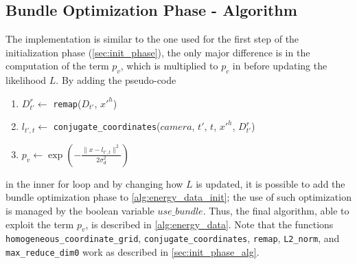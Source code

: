 \documentclass[notitlepage,english]{hgbreport}
\begin{document}
\subsection{Bundle Optimization Phase - Algorithm}
The implementation is similar to the one used for the first step of the initialization phase (\cref{sec:init_phase}), the only major difference is in the computation of the term $p_v$, which is multiplied to $p_c$ in before updating the likelihood $L$. By adding the pseudo-code
\begin{enumerate}
		\item $D^r_{t'} \leftarrow$ \texttt{remap}($D_{t'}$, $x'^h$)
		\item $l_{t',t}\leftarrow$ \texttt{conjugate\_coordinates}($camera$, $t'$,  $t$, $x'^h$, $D^r_{t'}$)

		\item $p_v \leftarrow \exp\left(-\frac{\lVert x - l_{t',t}\rVert^2}{2\sigma_d^2}\right)$
\end{enumerate}
in the inner for loop and by changing how $L$ is updated, it is possible to add the bundle optimization phase  to \cref{alg:energy_data_init}; the use of such optimization is managed by the boolean variable $use\_bundle$.
Thus, the final algorithm, able to exploit the term $p_v$, is described in \cref{alg:energy_data}. Note that the functions \texttt{homogeneous\_coordinate\_grid}, \texttt{conjugate\_coordinates}, \texttt{remap},  \texttt{L2\_norm}, and  \texttt{max\_reduce\_dim0} work as described in \cref{sec:init_phase_alg}.
\end{document}
